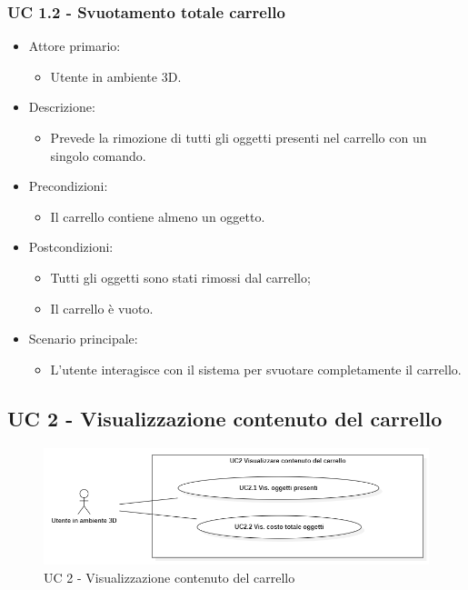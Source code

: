 \subsubsection{UC 1.2 - Svuotamento totale carrello}
\begin{itemize}
	
	\item Attore primario: 
	\begin{itemize}
		\item Utente in ambiente 3D.
	\end{itemize}
	\item Descrizione:
	\begin{itemize}
		\item Prevede la rimozione di tutti gli oggetti presenti nel carrello con un singolo comando.
	\end{itemize}
	
	\item Precondizioni:
	\begin{itemize}
		\item Il carrello contiene almeno un oggetto.
	\end{itemize}
	
	\item Postcondizioni:
	\begin{itemize}
		\item Tutti gli oggetti sono stati rimossi dal carrello;
		\item Il carrello è vuoto.
	\end{itemize}
	
	\item Scenario principale:
	\begin{itemize}
		\item L'utente interagisce con il sistema per svuotare completamente il carrello.
	\end{itemize}
	
\end{itemize}

\pagebreak

\subsection{UC 2 - Visualizzazione contenuto del carrello}

\begin{figure}[H]
  \renewcommand{\thefigure}{2}
  \includegraphics[width=\linewidth]{./res/images/UC2.png}
  \caption{UC 2 - Visualizzazione contenuto del carrello}
  \label{fig:UC 2}
\end{figure}

